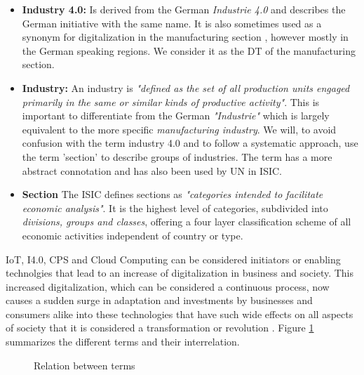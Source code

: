 \begin{itemize}
  \item  \textbf{Industry 4.0:} Is derived from the German \emph{Industrie 4.0} and describes the German initiative with the same name. It is also sometimes used as a synonym for digitalization in the manufacturing section \cite{McKinseydigitizationIndustrialSector:2015}, however mostly in the German speaking regions. We consider it as the \acl{DT} of the manufacturing section.


  \item \textbf{Industry:} An industry is \emph{"defined as the set of all production units engaged primarily in the same or similar kinds of productive activity"}\cite{ISIC:2008}. This is important to differentiate from the German \emph{"Industrie"} which is largely equivalent to the more specific \emph{manufacturing industry}. We will, to avoid confusion with the term industry 4.0 and to follow a systematic approach, use the term 'section' to describe groups of industries. The term has a more abstract connotation and has also been used by \ac{UN} in \ac{ISIC}\cite{ISIC:2008}.

\item \textbf{Section} The \acf{ISIC} defines sections as  \emph{"categories intended to facilitate economic analysis"}\cite{ISIC:2008}. It is the highest level of categories, subdivided into \emph{divisions, groups and classes}, offering a four layer classification scheme of all economic activities independent of country or type. 

\end{itemize}

\ac{IoT}, \ac{I4.0}, \ac{CPS} and Cloud Computing can be considered initiators or enabling technolgies that lead to an increase of digitalization in business and society. This increased digitalization, which can be considered a continuous process, now causes a sudden surge in adaptation and investments by businesses and consumers alike into these technologies that have such wide effects on all aspects of society that it is considered a transformation or revolution \cite{Kagermann:2013}.
Figure \ref{fig:terms} summarizes the different terms and their interrelation.

\begin{figure}[H]
\centering
{}
\caption{Relation between terms} \label{fig:terms}
\end{figure}

